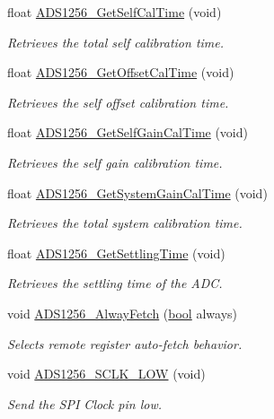\begin{DoxyCompactItemize}
float \hyperlink{group__ads1256__driver_ga4a1749dfc2cad3986a2f29cbe6e63b87}{A\-D\-S1256\-\_\-\-Get\-Self\-Cal\-Time} (void)
\begin{DoxyCompactList}\small\item\em Retrieves the total self calibration time. \end{DoxyCompactList}\item 
float \hyperlink{group__ads1256__driver_ga2628d1ea4f1436c89584bcc47baf79ef}{A\-D\-S1256\-\_\-\-Get\-Offset\-Cal\-Time} (void)
\begin{DoxyCompactList}\small\item\em Retrieves the self offset calibration time. \end{DoxyCompactList}\item 
float \hyperlink{group__ads1256__driver_ga041017c82a9411b72436c29667e98960}{A\-D\-S1256\-\_\-\-Get\-Self\-Gain\-Cal\-Time} (void)
\begin{DoxyCompactList}\small\item\em Retrieves the self gain calibration time. \end{DoxyCompactList}\item 
float \hyperlink{group__ads1256__driver_ga429559f049274cd24a6be2b20fd82973}{A\-D\-S1256\-\_\-\-Get\-System\-Gain\-Cal\-Time} (void)
\begin{DoxyCompactList}\small\item\em Retrieves the total system calibration time. \end{DoxyCompactList}\item 
float \hyperlink{group__ads1256__driver_ga5cb8add9c1b77b2cf87be526d6363d1c}{A\-D\-S1256\-\_\-\-Get\-Settling\-Time} (void)
\begin{DoxyCompactList}\small\item\em Retrieves the settling time of the A\-D\-C. \end{DoxyCompactList}\item 
void \hyperlink{group__ads1256__driver_gad426414f0eab896faac18f0c6d4dbaa2}{A\-D\-S1256\-\_\-\-Alway\-Fetch} (\hyperlink{group__data__types_ga0ecf26b576b9a54eca656b9be7ba6a06}{bool} always)
\begin{DoxyCompactList}\small\item\em Selects remote register auto-\/fetch behavior. \end{DoxyCompactList}\item 
void \hyperlink{group__ads1256__driver_ga525f292542208f8309ee79c912b77334}{A\-D\-S1256\-\_\-\-S\-C\-L\-K\-\_\-\-L\-O\-W} (void)
\begin{DoxyCompactList}\small\item\em Send the S\-P\-I Clock pin low. \end{DoxyCompactList}\item 

\end{DoxyCompactItemize}
